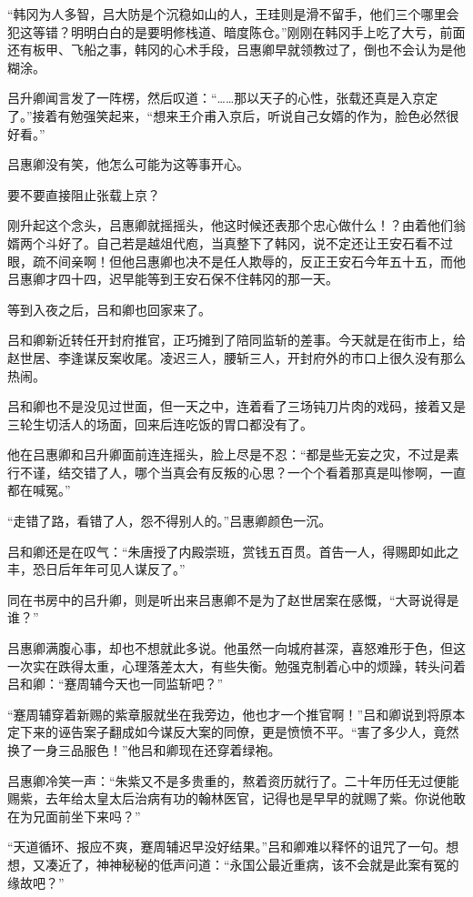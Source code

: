 “韩冈为人多智，吕大防是个沉稳如山的人，王珪则是滑不留手，他们三个哪里会犯这等错？明明白白的是要明修栈道、暗度陈仓。”刚刚在韩冈手上吃了大亏，前面还有板甲、飞船之事，韩冈的心术手段，吕惠卿早就领教过了，倒也不会认为是他糊涂。

吕升卿闻言发了一阵楞，然后叹道：“……那以天子的心性，张载还真是入京定了。”接着有勉强笑起来，“想来王介甫入京后，听说自己女婿的作为，脸色必然很好看。”

吕惠卿没有笑，他怎么可能为这等事开心。

要不要直接阻止张载上京？

刚升起这个念头，吕惠卿就摇摇头，他这时候还表那个忠心做什么！？由着他们翁婿两个斗好了。自己若是越俎代庖，当真整下了韩冈，说不定还让王安石看不过眼，疏不间亲啊！但他吕惠卿也决不是任人欺辱的，反正王安石今年五十五，而他吕惠卿才四十四，迟早能等到王安石保不住韩冈的那一天。

等到入夜之后，吕和卿也回家来了。

吕和卿新近转任开封府推官，正巧摊到了陪同监斩的差事。今天就是在街市上，给赵世居、李逢谋反案收尾。凌迟三人，腰斩三人，开封府外的市口上很久没有那么热闹。

吕和卿也不是没见过世面，但一天之中，连着看了三场钝刀片肉的戏码，接着又是三轮生切活人的场面，回来后连吃饭的胃口都没有了。

他在吕惠卿和吕升卿面前连连摇头，脸上尽是不忍：“都是些无妄之灾，不过是素行不谨，结交错了人，哪个当真会有反叛的心思？一个个看着那真是叫惨啊，一直都在喊冤。”

“走错了路，看错了人，怨不得别人的。”吕惠卿颜色一沉。

吕和卿还是在叹气：“朱唐授了内殿崇班，赏钱五百贯。首告一人，得赐即如此之丰，恐日后年年可见人谋反了。”

同在书房中的吕升卿，则是听出来吕惠卿不是为了赵世居案在感慨，“大哥说得是谁？”

吕惠卿满腹心事，却也不想就此多说。他虽然一向城府甚深，喜怒难形于色，但这一次实在跌得太重，心理落差太大，有些失衡。勉强克制着心中的烦躁，转头问着吕和卿：“蹇周辅今天也一同监斩吧？”

“蹇周辅穿着新赐的紫章服就坐在我旁边，他也才一个推官啊！”吕和卿说到将原本定下来的诬告案子翻成如今谋反大案的同僚，更是愤愤不平。“害了多少人，竟然换了一身三品服色！”他吕和卿现在还穿着绿袍。

吕惠卿冷笑一声：“朱紫又不是多贵重的，熬着资历就行了。二十年历任无过便能赐紫，去年给太皇太后治病有功的翰林医官，记得也是早早的就赐了紫。你说他敢在为兄面前坐下来吗？”

“天道循环、报应不爽，蹇周辅迟早没好结果。”吕和卿难以释怀的诅咒了一句。想想，又凑近了，神神秘秘的低声问道：“永国公最近重病，该不会就是此案有冤的缘故吧？”

